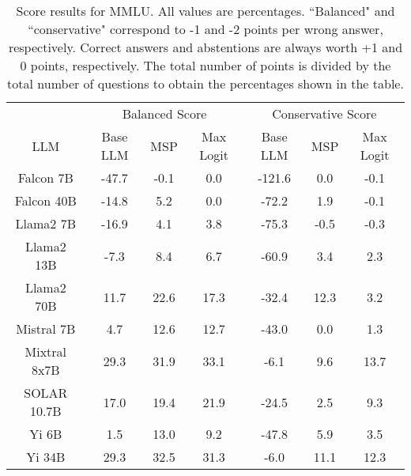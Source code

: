\begin{table*}
\centering
\begin{tabular}{c|c|c|c|c|c|c}
& \multicolumn{3}{c|}{Balanced Score} & \multicolumn{3}{c}{Conservative Score} \\ 
LLM & Base LLM & MSP & Max Logit & Base LLM & MSP & Max Logit\\ \hline
Falcon 7B & -47.7 & -0.1 & 0.0 & -121.6 & 0.0 & -0.1\\
Falcon 40B & -14.8 & 5.2 & 0.0 & -72.2 & 1.9 & -0.1\\
Llama2 7B & -16.9 & 4.1 & 3.8 & -75.3 & -0.5 & -0.3\\
Llama2 13B & -7.3 & 8.4 & 6.7 & -60.9 & 3.4 & 2.3\\
Llama2 70B & 11.7 & 22.6 & 17.3 & -32.4 & 12.3 & 3.2\\
Mistral 7B & 4.7 & 12.6 & 12.7 & -43.0 & 0.0 & 1.3\\
Mixtral 8x7B & 29.3 & 31.9 & 33.1 & -6.1 & 9.6 & 13.7\\
SOLAR 10.7B & 17.0 & 19.4 & 21.9 & -24.5 & 2.5 & 9.3\\
Yi 6B & 1.5 & 13.0 & 9.2 & -47.8 & 5.9 & 3.5\\
Yi 34B & 29.3 & 32.5 & 31.3 & -6.0 & 11.1 & 12.3\\
\hline
\end{tabular}
\caption{Score results for MMLU. All values are percentages. ``Balanced" and ``conservative" correspond to -1 and -2 points per wrong answer, respectively. Correct answers and abstentions are always worth +1 and 0 points, respectively. The total number of points is divided by the total number of questions to obtain the percentages shown in the table.}
\label{tab:mmlu_score}
\end{table*}

